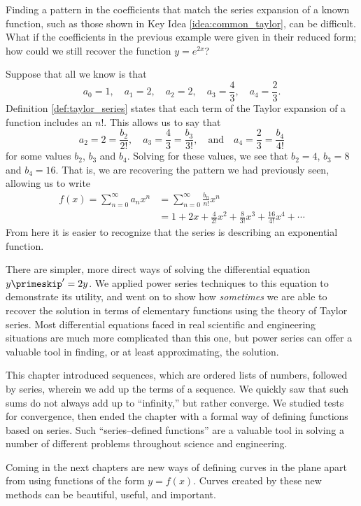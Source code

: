 Finding a pattern in the coefficients that match the series expansion of a known function, such as those shown in Key Idea \ref{idea:common_taylor}, can be difficult. What if the coefficients in the previous example were given in their reduced form; how could we still recover the function $y=e^{2x}$?

Suppose that all we know is that 
$$a_0=1,\quad a_1=2,\quad a_2=2,\quad a_3=\frac43,\quad a_4=\frac23.$$
Definition \ref{def:taylor_series} states that each term of the Taylor expansion of a function includes an $n!$. This allows us to say that
$$a_2=2=\frac{b_2}{2!},\quad a_3 = \frac43=\frac{b_3}{3!},\quad \text{and}\quad a_4 = \frac23=\frac{b_4}{4!}$$
for some values $b_2$, $b_3$ and $b_4$.
Solving for these values, we see that $b_2=4$, $b_3 = 8$ and $b_4=16$. That is, we are recovering the pattern we had previously seen, allowing us to write 
\begin{align*}
	f(x) = \sum_{n=0}^\infty a_nx^n
	&= \sum_{n=0}^\infty \frac{b_n}{n!}x^n \\
	&= 1+2x+ \frac{4}{2!}x^2 + \frac{8}{3!}x^3+\frac{16}{4!}x^4 + \dotsb
\end{align*}
From here it is easier to recognize that the series is describing an exponential function.

There are simpler, more direct ways of solving the differential equation $y\primeskip' = 2y$. We applied power series techniques to this equation to demonstrate its utility, and went on to show how \emph{sometimes} we are able to recover the solution in terms of elementary functions using the theory of Taylor series. Most differential equations faced in real scientific and engineering situations are much more complicated than this one, but power series can offer a valuable tool in finding, or at least approximating, the solution.\bigskip

This chapter introduced sequences, which are ordered lists of numbers, followed by series, wherein we add up the terms of a sequence. We quickly saw that such sums do not always add up to ``infinity,'' but rather converge. We studied tests for convergence, then ended the chapter with a formal way of defining functions based on series. Such ``series--defined functions'' are a valuable tool in solving a number of different problems throughout science and engineering.

Coming in the next chapters are new ways of defining curves in the plane apart from using functions of the form $y=f(x)$. Curves created by these new methods can be beautiful, useful, and important. 



